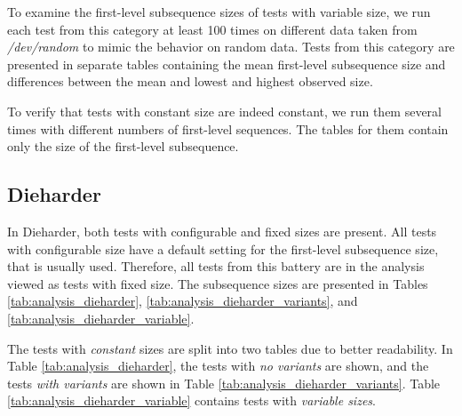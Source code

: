 \documentclass[
  digital,     %
  oneside,     %
  nosansbold,  %
  nocolorbold, %
  nolof,         %
  nolot,         %
]{fithesis4}
\begin{document}
To examine the first-level subsequence sizes of tests with variable size, we run each test from this category at least 100 times on different data taken from \emph{/dev/random} to mimic the behavior on random data. Tests from this category are presented in separate tables containing the mean first-level subsequence size and differences between the mean and lowest and highest observed size.

To verify that tests with constant size are indeed constant, we run them several times with different numbers of first-level sequences. The tables for them contain only the size of the first-level subsequence.

\subsection{Dieharder}

In Dieharder, both tests with configurable and fixed sizes are present. All tests with configurable size have a default setting for the first-level subsequence size, that is usually used. Therefore, all tests from this battery are in the analysis viewed as tests with fixed size. The subsequence sizes are presented in Tables \ref{tab:analysis_dieharder}, \ref{tab:analysis_dieharder_variants}, and \ref{tab:analysis_dieharder_variable}.

 The tests with \emph{constant} sizes are split into two tables due to better readability. In Table \ref{tab:analysis_dieharder}, the tests with \emph{no variants} are shown, and the tests \emph{with variants} are shown in Table \ref{tab:analysis_dieharder_variants}. Table \ref{tab:analysis_dieharder_variable} contains tests with \emph{variable sizes}.
\end{document}

